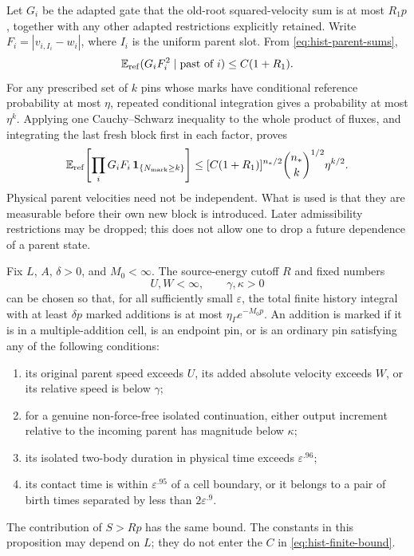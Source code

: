 Let $G_i$ be the adapted gate that the old-root squared-velocity sum is
at most $R_1p$, together with any other adapted restrictions explicitly
retained.  Write $F_i=|v_{i,I_i}-w_i|$, where $I_i$ is the uniform
parent slot.  From \eqref{eq:hist-parent-sums},
\begin{equation}
 \mathbb E_{\rm ref}(G_iF_i^2\mid\text{past of }i)
       \leq C(1+R_1).
 \label{eq:hist-reference-square}
\end{equation}
For any prescribed set of $k$ pins whose marks have conditional
reference probability at most $\eta$, repeated conditional integration
gives a probability at most $\eta^k$.  Applying one Cauchy--Schwarz
inequality to the whole product of fluxes, and integrating the last
fresh block first in each factor, proves
\begin{equation}
 \mathbb E_{\rm ref}\!\left[
       \prod_iG_iF_i\,\mathbf1_{\{N_{\rm mark}\geq k\}}\right]
 \leq [C(1+R_1)]^{n_*/2}
             \binom{n_*}{k}^{1/2}\eta^{k/2}.
 \label{eq:hist-reference-discard}
\end{equation}
Physical parent velocities need not be independent.  What is used is
that they are measurable before their own new block is introduced.
Later admissibility restrictions may be dropped; this does not allow
one to drop a future dependence of a parent state.

\begin{proposition}
\label{hist:irregular}
Fix $L$, $A$, $\delta>0$, and $M_0<\infty$.  The source-energy cutoff
$R$ and fixed numbers
\[
 U,W<\infty,\qquad \gamma,\kappa>0
\]
can be chosen so that, for all sufficiently small $\varepsilon$,
the total finite history integral with at least $\delta p$ marked
additions is at most $\eta_\Gamma e^{-M_0p}$.  An addition is marked
if it is in a multiple-addition cell, is an endpoint pin, or is an
ordinary pin satisfying any of the following conditions:
\begin{enumerate}
\item its original parent speed exceeds $U$, its added absolute
velocity exceeds $W$, or its relative speed is below $\gamma$;
\item for a genuine non-force-free isolated continuation, either
output increment relative to the incoming parent has magnitude below
$\kappa$;
\item its isolated two-body duration in physical time exceeds
$\varepsilon^{.96}$;
\item its contact time is within $\varepsilon^{.95}$ of a cell
boundary, or it belongs to a pair of birth times separated by less
than $2\varepsilon^{.9}$.
\end{enumerate}
The contribution of $S>Rp$ has the same bound.  The constants in this
proposition may depend on $L$; they do not enter the $C$ in
\eqref{eq:hist-finite-bound}.
\end{proposition}

